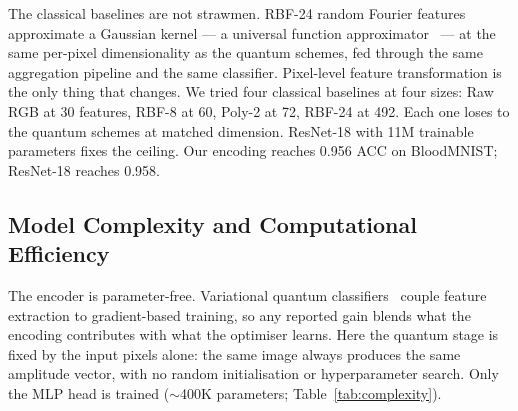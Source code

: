 \documentclass[conference,compsoc]{IEEEtran}
\begin{document}
The classical baselines are not strawmen. RBF-24 random Fourier features approximate a Gaussian kernel --- a universal function approximator~\cite{rahimi2007random} --- at the same per-pixel dimensionality as the quantum schemes, fed through the same aggregation pipeline and the same classifier. Pixel-level feature transformation is the only thing that changes. We tried four classical baselines at four sizes: Raw RGB at 30 features, RBF-8 at 60, Poly-2 at 72, RBF-24 at 492. Each one loses to the quantum schemes at matched dimension. ResNet-18 with 11M trainable parameters fixes the ceiling. Our encoding reaches 0.956 ACC on BloodMNIST; ResNet-18 reaches 0.958.

\subsection{Model Complexity and Computational Efficiency}

The encoder is parameter-free. Variational quantum classifiers~\cite{benedetti2019parameterized} couple feature extraction to gradient-based training, so any reported gain blends what the encoding contributes with what the optimiser learns. Here the quantum stage is fixed by the input pixels alone: the same image always produces the same amplitude vector, with no random initialisation or hyperparameter search. Only the MLP head is trained ($\sim$400K parameters; Table~\ref{tab:complexity}).
\end{document}
